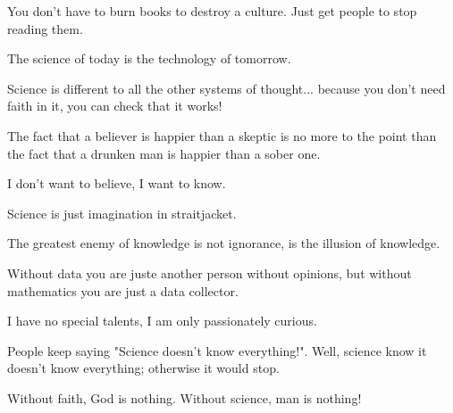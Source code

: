 \documentclass[12pt,a4paper,twoside,openright]{report}
\theoremstyle{definition}
\theoremstyle{itexmp}
\numberwithin{equation}{section}
\begin{document}
 	\begin{fquote}You don't have to burn books to destroy a culture. Just get people to stop reading them.
 	\end{fquote}
 	
 	 \begin{fquote}The science of today is the technology of tomorrow.
 	\end{fquote}
 	
 	 \begin{fquote}Science is different to all the other systems of thought... because you don't need faith in it, you can check that it works!
 	\end{fquote}
 	
 	\begin{fquote}The fact that a believer is happier than a skeptic is no more to the point than the fact that a drunken man is happier than a sober one.
 	\end{fquote}
 	
 	\begin{fquote}I don't want to believe, I want to know.
 	\end{fquote}
 	
 	 \begin{fquote}Science is just imagination in straitjacket.
 	\end{fquote}
 	
 	 \begin{fquote}The greatest enemy of knowledge is not ignorance, is the illusion of knowledge.
 	\end{fquote}
 	
 	 \begin{fquote}[?]Without data you are juste another person without opinions, but without mathematics you are just a data collector.
 	\end{fquote}
 	
 	\begin{fquote}I have no special talents, I am only passionately curious.
 	\end{fquote}

	\begin{fquote}People keep saying "Science doesn't know everything!". Well, science know it doesn't know everything; otherwise it would stop.
 	\end{fquote}
 	
 	\begin{fquote}[?]Without faith, God is nothing. Without science, man is nothing!
 	\end{fquote}
\end{document}
